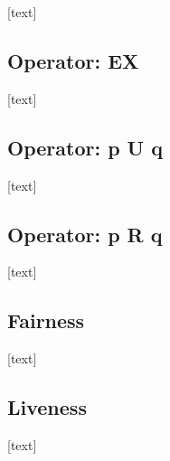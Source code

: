 \documentclass{article}
\begin{document}
		[text]
		
		\subsection{Operator: EX}
				
		[text]
		
		\subsection{Operator: p U q}
				
		[text]
		
		\subsection{Operator: p R q}
				
		[text]
		
		\subsection{Fairness}
				
		[text]
		
		\subsection{Liveness}
			
		[text]
		
	
	\newpage
	
	
	 
	
\end{document}
